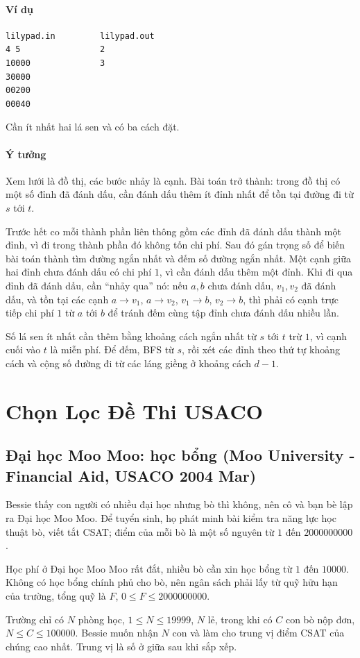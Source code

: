\documentclass[11pt]{article}
\newcommand{\problem}[1]{\subsection{#1}}
\newcommand{\iosec}[1]{\paragraph{#1}}
\begin{document}
\iosec{Ví dụ}
\begin{verbatim}
lilypad.in         lilypad.out
4 5                2
10000              3
30000
00200
00040
\end{verbatim}

Cần ít nhất hai lá sen và có ba cách đặt.

\iosec{Ý tưởng}
Xem lưới là đồ thị, các bước nhảy là cạnh. Bài toán trở thành: trong đồ thị có một số đỉnh đã đánh dấu, cần đánh dấu thêm ít đỉnh nhất để tồn tại đường đi từ \(s\) tới \(t\).

Trước hết co mỗi thành phần liên thông gồm các đỉnh đã đánh dấu thành một đỉnh, vì đi trong thành phần đó không tốn chi phí. Sau đó gán trọng số để biến bài toán thành tìm đường ngắn nhất và đếm số đường ngắn nhất. Một cạnh giữa hai đỉnh chưa đánh dấu có chi phí \(1\), vì cần đánh dấu thêm một đỉnh. Khi đi qua đỉnh đã đánh dấu, cần ``nhảy qua'' nó: nếu \(a,b\) chưa đánh dấu, \(v_1,v_2\) đã đánh dấu, và tồn tại các cạnh \(a\to v_1\), \(a\to v_2\), \(v_1\to b\), \(v_2\to b\), thì phải có cạnh trực tiếp chi phí \(1\) từ \(a\) tới \(b\) để tránh đếm cùng tập đỉnh chưa đánh dấu nhiều lần.

Số lá sen ít nhất cần thêm bằng khoảng cách ngắn nhất từ \(s\) tới \(t\) trừ \(1\), vì cạnh cuối vào \(t\) là miễn phí. Để đếm, BFS từ \(s\), rồi xét các đỉnh theo thứ tự khoảng cách và cộng số đường đi từ các láng giềng ở khoảng cách \(d-1\).

\section{Chọn Lọc Đề Thi USACO}

\problem{Đại học Moo Moo: học bổng (Moo University - Financial Aid, USACO 2004 Mar)}

Bessie thấy con người có nhiều đại học nhưng bò thì không, nên cô và bạn bè lập ra Đại học Moo Moo. Để tuyển sinh, họ phát minh bài kiểm tra năng lực học thuật bò, viết tắt CSAT; điểm của mỗi bò là một số nguyên từ \(1\) đến \(2000000000\).

Học phí ở Đại học Moo Moo rất đắt, nhiều bò cần xin học bổng từ \(1\) đến \(10000\). Không có học bổng chính phủ cho bò, nên ngân sách phải lấy từ quỹ hữu hạn của trường, tổng quỹ là \(F\), \(0 \le F \le 2000000000\).

Trường chỉ có \(N\) phòng học, \(1 \le N \le 19999\), \(N\) lẻ, trong khi có \(C\) con bò nộp đơn, \(N \le C \le 100000\). Bessie muốn nhận \(N\) con và làm cho trung vị điểm CSAT của chúng cao nhất. Trung vị là số ở giữa sau khi sắp xếp.
\end{document}
